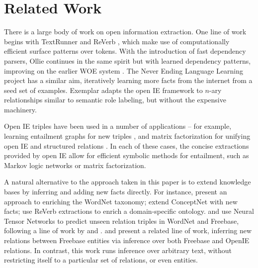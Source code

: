 \chapter{Related Work}

%
%
%
There is a large body of work on open information extraction.
One line of work begins with
  TextRunner \cite{key:2007yates-textrunner} and
  ReVerb \cite{key:2011fader-reverb}, which make use of computationally
  efficient surface patterns over tokens.
With the introduction of fast dependency parsers,
  Ollie \cite{key:2012mausam-ollie} continues in the same spirit but with
  learned dependency patterns, improving on the earlier WOE system
  \cite{key:2010wu-openie}.
The Never Ending Language Learning project \cite{key:2010carlson-nell}
  has a similar aim, iteratively learning more facts from the internet
  from a seed set of examples.
Exemplar \cite{key:2013mesquita-exemplar} adapts the open IE framework to
  $n$-ary relationships similar to semantic role labeling, but without the
  expensive machinery.

Open IE triples have been used in a number of applications --
  for example, learning entailment graphs for new triples
  \cite{key:2011berant-entailment}, and
  matrix factorization for unifying open IE and structured relations
  \cite{key:2012yao-schemas,key:2013riedel-schemas}.
In each of these cases, the concise extractions provided by open IE allow
  for efficient symbolic methods for entailment, such as Markov logic
  networks or matrix factorization.

A natural alternative to the approach taken in this paper is to
  extend knowledge bases by inferring and adding new facts directly.
For instance,
   present an approach to enriching 
    the WordNet taxonomy;
   extend ConceptNet with new facts;
   use ReVerb extractions to 
    enrich a domain-specific ontology.
 and 
  use Neural Tensor Networks to predict unseen relation triples in
  WordNet and Freebase, following a line of work by
   and
  .
 and 
  present a related line of work, inferring new relations between
  Freebase entities via inference over both Freebase and
  OpenIE relations.
In contrast, this work runs inference over arbitrary text, without 
  restricting itself to a particular set of relations, or even entities.


